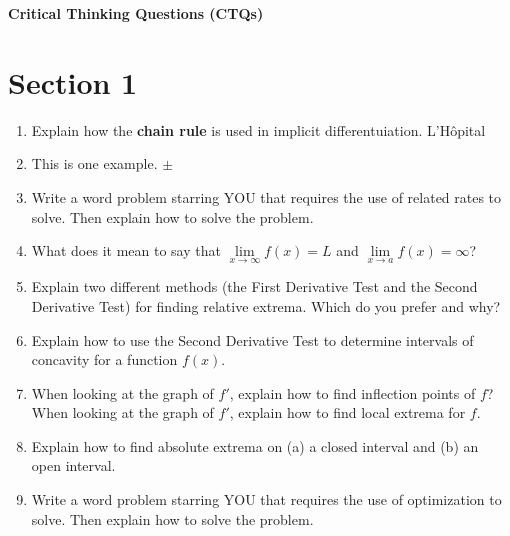 \documentclass[12pt]{article}
\begin{document}
\textbf{Critical Thinking Questions (CTQs)}
\section{Section 1}
\begin{enumerate}
\setlength\itemsep{1em}

\item Explain how the \textbf{chain rule} is used in implicit differentuiation.  L'H\^{o}pital
\item This is one example. $\pm$
\item Write a word problem starring YOU that requires the use of related rates to solve. Then explain how to solve the problem. 
\item What does it mean to say that $\lim\limits_{x \to \infty}f(x)=L$ and $\lim\limits_{x \to a}f(x)=\infty$?
\item Explain two different methods (the First Derivative Test and the Second Derivative Test) for finding relative extrema. Which do you prefer and why?
\item Explain how to use the Second Derivative Test to determine intervals of concavity for a function $f(x)$.
\item When looking at the graph of $f'$, explain how to find inflection points of $f$? When looking at the graph of $f'$, explain how to find local extrema for $f$.
\item Explain how to find absolute extrema on (a) a closed interval and (b) an open interval.
\item Write a word problem starring YOU that requires the use of optimization to solve. Then explain how to solve the problem.
\end{enumerate}
\end{document}
